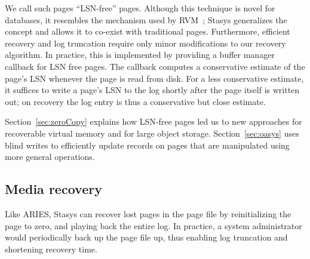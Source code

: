 \documentclass[letterpaper,twocolumn,10pt]{article}
\newcommand{\yad}{Stasys\xspace}
\newcommand{\eat}[1]{}
\begin{document}
We call such pages ``LSN-free'' pages.  Although this technique is
novel for databases, it resembles the mechanism used by
RVM~\cite{rvm}; \yad generalizes the concept and allows it to
co-exist with traditional pages.  Furthermore, efficient recovery and
log truncation require only minor modifications to our recovery
algorithm.  In practice, this is implemented by providing a buffer manager callback
for LSN free pages.  The callback computes a
conservative estimate of the page's LSN whenever the page is read from disk.
For a less conservative estimate, it suffices to write a page's LSN to
the log shortly after the page itself is written out; on recovery the
log entry is thus a conservative but close estimate.

Section~\ref{sec:zeroCopy} explains how LSN-free pages led us to new 
approaches for recoverable virtual memory and for large object storage.  
Section~\ref{sec:oasys} uses blind writes to efficiently update records 
on pages that are manipulated using more general operations.

\subsection{Media recovery}

Like ARIES, \yad can recover lost pages in the page file by
reinitializing the page to zero, and playing back the entire log.  In
practice, a system administrator would periodically back up the page file
up, thus enabling log truncation and shortening recovery time.

\eat{  This is pretty redundant.
\subsection{Modular operations semantics}

The smallest unit of a \yad transaction is the {\em operation}.  An
operation consists of a {\em redo} function, {\em undo} function, and
a log format.  At runtime or if recovery decides to reapply the
operation, the redo function is invoked with the contents of the log
entry as an argument.  During abort, or if recovery decides to undo
the operation, the undo function is invoked with the contents of the
log as an argument.  Like Berkeley DB, and most database toolkits, we
allow system designers to define new operations.  Unlike earlier
systems, we have based our library of operations on object oriented
collection libraries, and have built complex index structures from
simpler structures.  These modules are all directly avaialable,
providing a wide range of data structures to applications, and
facilitating the develop of more complex structures through reuse.  We
compare the peroformance of our modular approach with a monolithic
implementation on top of \yad, using Berkeley DB as a baseline.
}
\end{document}
